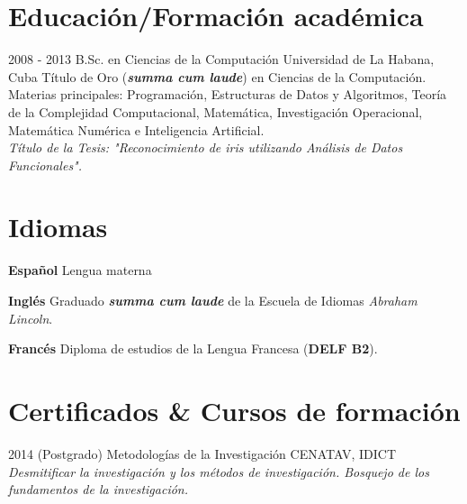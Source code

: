 \documentclass[]{friggeri-cv}
\begin{document}
\section{Educación/Formación académica}
\begin{entrylist}

  \entry
    {2008 - 2013}
    {B.Sc. en Ciencias de la Computación}
    {Universidad de La Habana, Cuba}
    {Título de Oro (\textbf{\emph{summa cum laude}}) en Ciencias de la Computación. Materias principales: Programación, Estructuras de Datos y Algoritmos, Teoría de la Complejidad Computacional, Matemática, Investigación Operacional, Matemática Numérica e Inteligencia Artificial.\\
    \emph{Título de la Tesis: "Reconocimiento de iris utilizando Análisis de Datos Funcionales".}}

\end{entrylist}

\section{Idiomas}
\begin{entrylist}
  \entry
    {\textbf{Español}}
    {}
    {}
    {Lengua materna}      

  \entry
    {\textbf{Inglés}}
    {}
    {}
    {Graduado \textbf{\emph{summa cum laude}} de la Escuela de Idiomas \emph{Abraham Lincoln}.}

  \entry
    {\textbf{Francés}}
    {}
    {}
    {Diploma de estudios de la Lengua Francesa (\textbf{DELF B2}).}
\end{entrylist}

\section{Certificados \& Cursos de formación}
\begin{entrylist}
  \entry
    {2014}
    {(Postgrado) Metodologías de la Investigación}
    {CENATAV, IDICT}
    {\emph{Desmitificar la investigación y los métodos de investigación. Bosquejo de los fundamentos de la investigación.}}
\end{entrylist}
\end{document}
